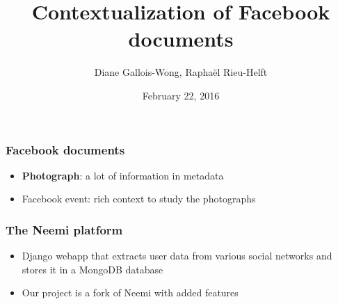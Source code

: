 \documentclass[18pt]{beamer}
\title{Contextualization of Facebook documents}
\author{Diane Gallois-Wong, Raphaël Rieu-Helft}
\date{February 22, 2016}
\begin{document}
\begin{frame}
	\titlepage
\end{frame}

\begin{frame}
	\frametitle{Facebook documents}
\begin{itemize}
	\item{\textbf{Photograph}: a lot of information in metadata}
	\vspace{1em}
	\item{Facebook event: rich context to study the photographs}
\end{itemize}
\end{frame}

\begin{frame}
	\frametitle{The Neemi platform}
\begin{itemize}
	\item{Django webapp that extracts user data from various social networks and stores it in a MongoDB database}
	\vspace{1em}
	\item{Our project is a fork of Neemi with added features}
\end{itemize}
\end{frame}
\end{document}
